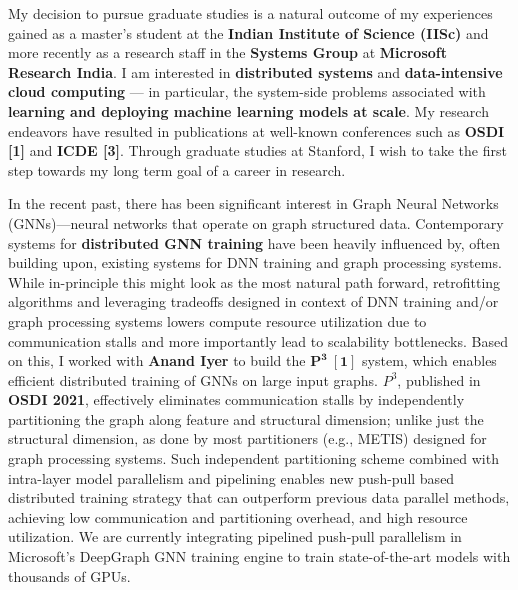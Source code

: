 \documentclass{article}
\newcommand{\school}{Stanford\xspace}
\begin{document}

My decision to pursue graduate studies is a natural outcome of my experiences gained as a master's student at the \textbf{Indian Institute of Science (IISc)} and more recently as a research staff in the \textbf{Systems Group} at \textbf{Microsoft Research India}. I am interested in \textbf{distributed systems} and \textbf{data-intensive cloud computing} — in particular, the system-side problems associated with \textbf{learning and deploying machine learning models at scale}. My research endeavors have resulted in publications at well-known conferences such as \textbf{OSDI [1]} and \textbf{ICDE [3]}. Through graduate studies at \school, I wish to take the first step towards my long term goal of a career in research.




In the recent past, there has been significant interest in Graph Neural Networks (GNNs)—neural networks that operate on graph structured data. Contemporary systems for \textbf{distributed GNN training} have been heavily influenced by, often building upon, existing systems for DNN training and graph processing systems. While in-principle this might look as the most natural path forward, retrofitting algorithms and leveraging tradeoffs designed in context of DNN training and/or graph processing systems lowers compute resource utilization due to communication stalls and more importantly lead to scalability bottlenecks.
Based on this, I worked with \textbf{Anand Iyer} to build the $\mathbf{P^{3} ~[1]}$ system, which enables efficient distributed training of GNNs on large input graphs. $P^{3}$, published in \textbf{OSDI 2021}, effectively eliminates communication stalls by independently partitioning the graph along feature and structural dimension; unlike just the structural dimension, as done by most partitioners (e.g., METIS) designed for graph processing systems. Such independent partitioning scheme combined with intra-layer model parallelism and pipelining enables new push-pull based distributed training strategy that can outperform previous data parallel methods, achieving low communication and partitioning overhead, and high resource utilization. We are currently integrating pipelined push-pull parallelism in Microsoft's DeepGraph GNN training engine to train state-of-the-art models with thousands of GPUs.
\end{document}
